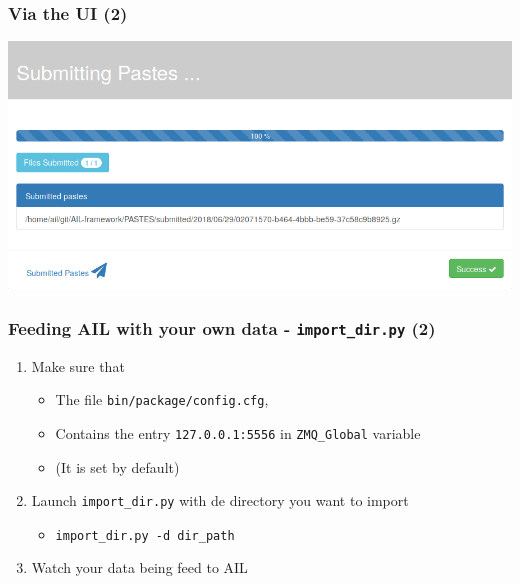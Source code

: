 \begin{frame}
    \frametitle{Via the UI (2)}
    \centerline{\includegraphics[scale=0.25]{screenshot/paste_submitted.png}}
\end{frame}



\begin{frame}
    \frametitle{Feeding AIL with your own data - \texttt{import\_dir.py} (2)}
    \begin{enumerate}
        \item Make sure that
            \begin{itemize}
                \item The file \texttt{\large{bin/package/config.cfg}},
                \item Contains the entry \texttt{127.0.0.1:5556} in \texttt{ZMQ\_Global} variable
                \item (It is set by default)
            \end{itemize}
        \pause
        \item Launch \texttt{import\_dir.py} with de directory you want to import
            \begin{itemize}
                \item \texttt{import\_dir.py -d dir\_path}
            \end{itemize}
        \pause
        \item Watch your data being feed to AIL
    \end{enumerate}
\end{frame}


